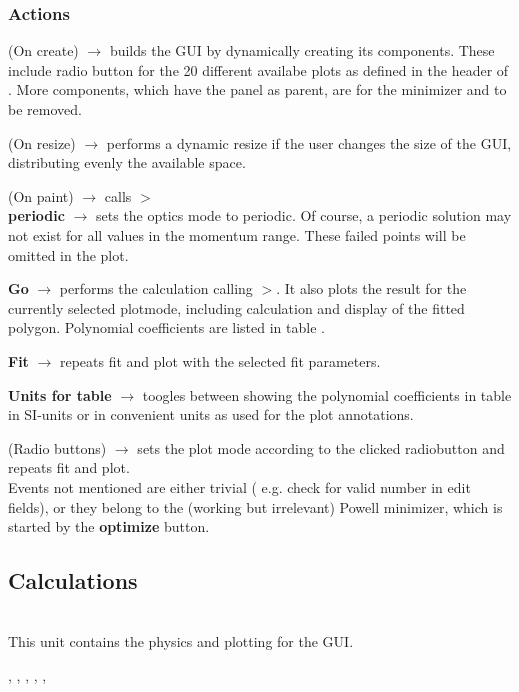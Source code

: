 \documentclass[12pt]{article}
\newcommand\code[1]{{\tt #1}}
\newcommand{\ofld}[1]{\colorbox{black!15}{{{\color{black}\bf #1}}}}
\newcommand{\ofldx}[1]{\colorbox{black!15}{{\color{black}(#1)}}}
\newcommand\guico[1]{{\color{blue}\code{#1}}}
\newcommand{\unico}[1]{{\color{burntorange}\code{#1}}}
\newcommand{\evcod}[2]{\ofld{#1} $\rightarrow$ \guico{#2}}
\newcommand{\evcodx}[2]{\ofldx{#1} $\rightarrow$ \guico{#2}}
\newcommand{\prcod}[2]{\opauni{#1}$>$\unico{#2}}
\newcommand{\opagui}[1]{\colorbox{blue!20}{{\color{black}\code{#1}}}}
\newcommand{\ogui}[1]{\hyperref[#1]{\opagui{#1}}}
\newcommand{\opaguif}[1]{\colorbox{violet!30}{{\color{black}\code{#1}}}}
\newcommand{\oguif}[1]{\hyperref[#1]{\opaguif{#1}}}
\newcommand{\opauni}[1]{\colorbox{orange!30}{{\color{black}\code{#1}}}}
\newcommand{\ounih}[2]{\subsection{\label{#2}#1}{\Huge\opauni{#2}}\\}
\newcommand{\ouni}[1]{\hyperref[#1]{\opauni{#1}}}
\newcommand{\uses}[1]{\flushleft {\bf Uses:} #1}
\newcommand{\desc}[1]{#1}
\newcommand{\act}[1]{\subsubsection*{Actions} #1}
\newcommand{\todo}[1]{{\color{red} #1}}
\begin{document}
\act{
\evcodx{On create}{FormCreate} builds the GUI by dynamically creating its components. These include radio button for the 20 different availabe plots as defined in the header of \ouni{momentumlib}. \todo{More components, which have the \guico{panmin} panel as parent, are for the minimizer and to be removed.}

\evcodx{On resize}{FormResize} performs a dynamic resize if the user changes the size of the GUI, distributing evenly the available space.

\evcodx{On paint}{FormPaint} calls \prcod{momentumlib}{MakePlot}\\

\evcod{periodic}{chkPerClick} sets the optics mode to periodic. Of course, a periodic solution may not exist for all values in the momentum range. These failed points will be omitted in the plot.

\evcod{Go}{butGoClick} performs the calculation calling \prcod{momentumlib}{FullCalc}. It also plots the result for the currently selected plotmode, including calculation and display of the fitted polygon. Polynomial coefficients are listed in table \guico{gfit}.

\evcod{Fit}{butFitClick} repeats fit and plot with the selected fit parameters.

\evcod{Units for table}{butfunitClick} toogles between showing the polynomial coefficients in table \guico{gfit} in SI-units or in convenient units as used for the plot annotations.

\evcodx{Radio buttons}{rbClick} sets the plot mode according to the clicked radiobutton and repeats fit and plot. \\

Events not mentioned are either trivial ( e.g. check for valid number in edit fields), or they belong to the (working but irrelevant) Powell minimizer, which is started by the \ofld{optimize} button. 
}


\ounih{Calculations}{momentumlib} 

\desc{This unit contains the physics and plotting for the \ogui{opamomentum} GUI.
}

\uses{\ouni{linoplib}, \ogui{opatunediag}, \ouni{globlib}, \ouni{mathlib}, \oguif{../com/asfigure}, \ouni{../com/asaux}} 
\end{document}
